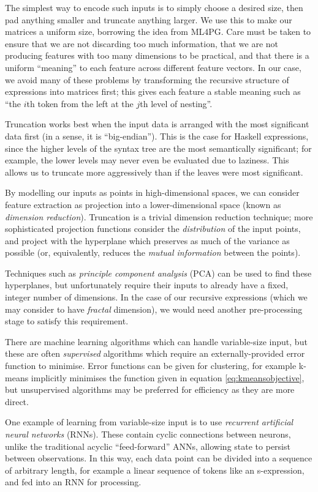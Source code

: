 The simplest way to encode such inputs is to simply choose a desired size, then pad anything smaller and truncate anything larger. We use this to make our matrices a uniform size, borrowing the idea from ML4PG. Care must be taken to ensure that we are not discarding too much information, that we are not producing features with too many dimensions to be practical, and that there is a uniform ``meaning'' to each feature across different feature vectors. In our case, we avoid many of these problems by transforming the recursive structure of expressions into matrices first; this gives each feature a stable meaning such as ``the $i$th token from the left at the $j$th level of nesting''.

Truncation works best when the input data is arranged with the most significant data first (in a sense, it is ``big-endian''). This is the case for Haskell expressions, since the higher levels of the syntax tree are the most semantically significant; for example, the lower levels may never even be evaluated due to laziness. This allows us to truncate more aggressively than if the leaves were most significant.

By modelling our inputs as points in high-dimensional spaces, we can consider feature extraction as projection into a lower-dimensional space (known as \emph{dimension reduction}). Truncation is a trivial dimension reduction technique; more sophisticated projection functions consider the \emph{distribution} of the input points, and project with the hyperplane which preserves as much of the variance as possible (or, equivalently, reduces the \emph{mutual information} between the points).

Techniques such as \emph{principle component analysis} (PCA) can be used to find these hyperplanes, but unfortunately require their inputs to already have a fixed, integer number of dimensions. In the case of our recursive expressions (which we may consider to have \emph{fractal} dimension), we would need another pre-processing stage to satisfy this requirement.

There are machine learning algorithms which can handle variable-size input, but these are often \emph{supervised} algorithms which require an externally-provided error function to minimise. Error functions can be given for clustering, for example k-means implicitly minimises the function given in equation \ref{eq:kmeansobjective}, but unsupervised algorithms may be preferred for efficiency as they are more direct.

One example of learning from variable-size input is to use \emph{recurrent artificial neural networks} (RNNs). These contain cyclic connections between neurons, unlike the traditional acyclic ``feed-forward'' ANNs, allowing state to persist between observations. In this way, each data point can be divided into a sequence of arbitrary length, for example a linear sequence of tokens like an s-expression, and fed into an RNN for processing.

